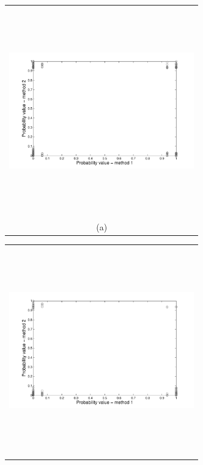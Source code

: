 \documentclass[12pt]{article}
\newcommand{\Pic}[2][0.85]{\begin{center}\texttt{[image: \#2]}
 \end{center} }
\begin{document}
\begin{figure}[H]
    \begin{minipage}[b]{0.6\textwidth}
        \begin{tabular}{c}
       \includegraphics[width=8cm,height=9cm,keepaspectratio]{figs_pdf/cloud_Galeras_low.pdf}\\
        (a)
        \end{tabular}
    \end{minipage}
    \begin{minipage}{0.6\textwidth}
        \begin{tabular}{c}
	\includegraphics[width=8cm,height=9cm,keepaspectratio]{figs_pdf/cloud_Mammoth_low.pdf}\\

\end{tabular}
\end{minipage}
\end{figure}
\end{document}
